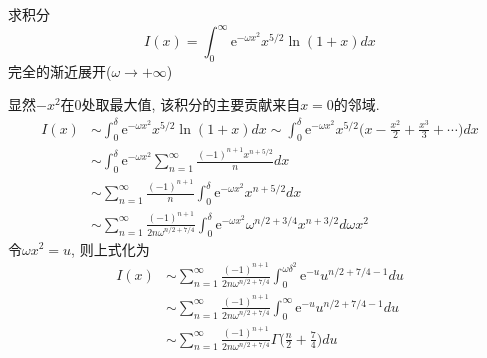 \begin{problem}[习题2.6]
求积分
\[
I(x) = \int_0^\infty \mathrm{e}^{-\omega x^2} x^{5/2}\ln(1+x)dx
\]
完全的渐近展开($\omega\rightarrow +\infty$)
\end{problem}

\begin{solution}
显然$-x^{2}$在0处取最大值, 该积分的主要贡献来自$x=0$的邻域.
\begin{align*}
I(x) & \sim\int_{0}^{\delta}\mathrm{e}^{-\omega x^{2}}x^{5/2}\ln(1+x)dx\sim\int_{0}^{\delta}\mathrm{e}^{-\omega x^{2}}x^{5/2}\Big(x-\frac{x^{2}}{2}+\frac{x^{3}}{3}+\cdots\Big)dx\\
 & \sim\int_{0}^{\delta}\mathrm{e}^{-\omega x^{2}}\sum_{n=1}^{\infty}\frac{(-1)^{n+1}x^{n+5/2}}{n}dx\\
 & \sim\sum_{n=1}^{\infty}\frac{(-1)^{n+1}}{n}\int_{0}^{\delta}\mathrm{e}^{-\omega x^{2}}x^{n+5/2}dx\\
 & \sim\sum_{n=1}^{\infty}\frac{(-1)^{n+1}}{2n\omega^{n/2+7/4}}\int_{0}^{\delta}\mathrm{e}^{-\omega x^{2}}\omega^{n/2+3/4}x^{n+3/2}d\omega x^{2}
\end{align*}
 令$\omega x^{2}=u$, 则上式化为
\begin{align*}
I(x) & \sim\sum_{n=1}^{\infty}\frac{(-1)^{n+1}}{2n\omega^{n/2+7/4}}\int_{0}^{\omega\delta^{2}}\mathrm{e}^{-u}u^{n/2+7/4-1}du\\
 & \sim\sum_{n=1}^{\infty}\frac{(-1)^{n+1}}{2n\omega^{n/2+7/4}}\int_{0}^{\infty}\mathrm{e}^{-u}u^{n/2+7/4-1}du\\
 & \sim\sum_{n=1}^{\infty}\frac{(-1)^{n+1}}{2n\omega^{n/2+7/4}}\Gamma\Big(\frac{n}{2}+\frac{7}{4}\Big)du
\end{align*}
\end{solution}
